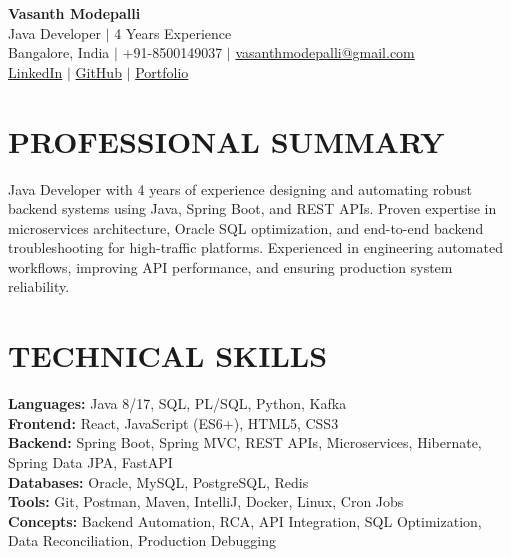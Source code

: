 \documentclass[a4paper,10pt]{article}
\begin{document}
\begin{center}
    {\Huge \textbf{Vasanth Modepalli}} \\ \vspace{2pt}
    Java Developer $|$ 4 Years Experience \\ \vspace{1pt}
    Bangalore, India $|$ +91-8500149037 $|$ \href{mailto:vasanthmodepalli@gmail.com}{vasanthmodepalli@gmail.com} \\ \vspace{2pt}
    \href{https://linkedin.com/in/}{LinkedIn} $|$ \href{https://github.com/}{GitHub} $|$ \href{https://portfolio.com/}{Portfolio}
\end{center}

\section*{PROFESSIONAL SUMMARY}
Java Developer with 4 years of experience designing and automating robust backend systems using Java, Spring Boot, and REST APIs. Proven expertise in microservices architecture, Oracle SQL optimization, and end-to-end backend troubleshooting for high-traffic platforms. Experienced in engineering automated workflows, improving API performance, and ensuring production system reliability.

\section*{TECHNICAL SKILLS}
\textbf{Languages:} Java 8/17, SQL, PL/SQL, Python, Kafka \\
\textbf{Frontend:} React, JavaScript (ES6+), HTML5, CSS3 \\
\textbf{Backend:} Spring Boot, Spring MVC, REST APIs, Microservices, Hibernate, Spring Data JPA, FastAPI \\
\textbf{Databases:} Oracle, MySQL, PostgreSQL, Redis \\
\textbf{Tools:} Git, Postman, Maven, IntelliJ, Docker, Linux, Cron Jobs \\
\textbf{Concepts:} Backend Automation, RCA, API Integration, SQL Optimization, Data Reconciliation, Production Debugging
\end{document}
